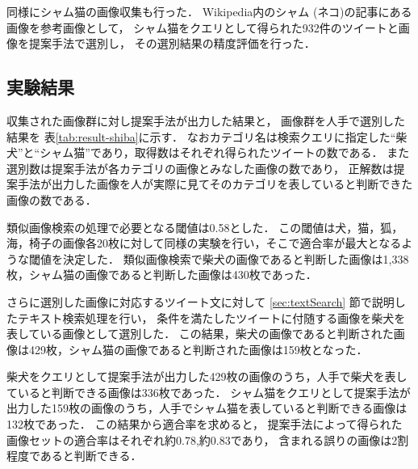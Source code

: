 \documentclass{deimj}
\begin{document}
同様にシャム猫の画像収集も行った．
Wikipedia内のシャム (ネコ)の記事にある画像を参考画像として，
シャム猫をクエリとして得られた932件のツイートと画像を提案手法で選別し，
その選別結果の精度評価を行った．

\subsection{実験結果}
\label{sec:expresult}

収集された画像群に対し提案手法が出力した結果と，
画像群を人手で選別した結果を
表\ref{tab:result-shiba}に示す．
なおカテゴリ名は検索クエリに指定した“柴犬”と“シャム猫”であり，取得数はそれぞれ得られたツイートの数である．
また選別数は提案手法が各カテゴリの画像とみなした画像の数であり，
正解数は提案手法が出力した画像を人が実際に見てそのカテゴリを表していると判断できた画像の数である．

類似画像検索の処理で必要となる閾値は0.58とした．
この閾値は犬，猫，狐，海，椅子の画像各20枚に対して同様の実験を行い，そこで適合率が最大となるような閾値を決定した．
類似画像検索で柴犬の画像であると判断した画像は1,338枚，シャム猫の画像であると判断した画像は430枚であった．

さらに選別した画像に対応するツイート文に対して
\ref{sec:textSearch}
節で説明したテキスト検索処理を行い，
条件を満たしたツイートに付随する画像を柴犬を表している画像として選別した．
この結果，柴犬の画像であると判断された画像は429枚，シャム猫の画像であると判断された画像は159枚となった．


柴犬をクエリとして提案手法が出力した429枚の画像のうち，人手で柴犬を表していると判断できる画像は336枚であった．
シャム猫をクエリとして提案手法が出力した159枚の画像のうち，人手でシャム猫を表していると判断できる画像は132枚であった．
この結果から適合率を求めると，
提案手法によって得られた画像セットの適合率はそれぞれ約0.78,約0.83であり，
含まれる誤りの画像は2割程度であると判断できる．

\end{document}
